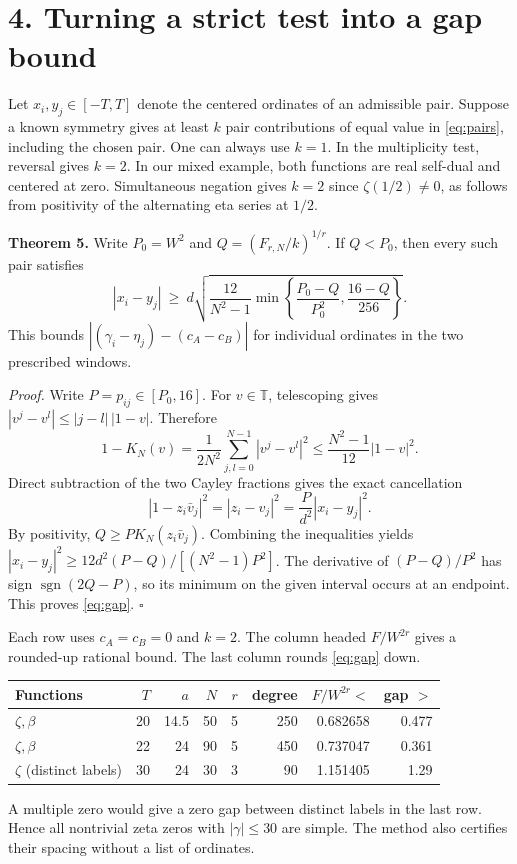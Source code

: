 \documentclass[11pt,letterpaper]{article}
\newcommand{\HH}[1]{\section*{\color{ink}#1}}
\newcommand{\subt}[1]{\par\smallskip{\sffamily\bfseries\color{teal}#1}\par\nobreak}
\newcommand{\op}[1]{\operatorname{#1}}
\newcommand{\TT}{\mathbb T}
\begin{document}
\newpage
\HH{4. Turning a strict test into a gap bound}
Let $x_i,y_j\in[-T,T]$ denote the centered ordinates of an admissible pair.
Suppose a known symmetry gives at least $k$ pair contributions of equal value
in \eqref{eq:pairs}, including the chosen pair. One can always use $k=1$.
In the multiplicity test, reversal gives $k=2$. In our mixed example,
both functions are real self-dual and centered at zero. Simultaneous
negation gives $k=2$ since $\zeta(1/2)\ne0$, as follows from positivity of the alternating eta
series at $1/2$.

\textbf{Theorem 5.} Write $P_0=W^2$ and $Q=(F_{r,N}/k)^{1/r}$.
If $Q<P_0$, then every such pair satisfies
\begin{equation}
 |x_i-y_j|\ \ge\ d\sqrt{\frac{12}{N^2-1}
   \min\!\left\{\frac{P_0-Q}{P_0^2},\frac{16-Q}{256}\right\}}.
 \label{eq:gap}
\end{equation}
This bounds $|(\gamma_i-\eta_j)-(c_A-c_B)|$ for individual ordinates
in the two prescribed windows.

\emph{Proof.} Write $P=p_{ij}\in[P_0,16]$. For $v\in\TT$, telescoping gives
$|v^j-v^l|\le |j-l|\,|1-v|$. Therefore
\[
 1-K_N(v)=\frac1{2N^2}\sum_{j,l=0}^{N-1}|v^j-v^l|^2
       \le\frac{N^2-1}{12}|1-v|^2 .
\]
Direct subtraction of the two Cayley fractions gives the exact cancellation
\[
 |1-z_i\bar v_j|^2=|z_i-v_j|^2=\frac{P}{d^2}|x_i-y_j|^2 .
\]
By positivity, $Q\ge P K_N(z_i\bar v_j)$. Combining the inequalities yields
$|x_i-y_j|^2\ge 12d^2(P-Q)/[(N^2-1)P^2]$. The derivative of
$(P-Q)/P^2$ has sign $\op{sgn}(2Q-P)$, so its minimum on the given
interval occurs at an endpoint. This proves \eqref{eq:gap}. \hfill$\square$

\subt{Verified applications}
Each row uses $c_A=c_B=0$ and $k=2$. The column headed $F/W^{2r}$
gives a rounded-up rational bound. The last column rounds \eqref{eq:gap} down.
\begin{center}\small
\begin{tabular}{@{}lrrrrrrr@{}}\toprule
Functions & $T$ & $a$ & $N$ & $r$ & degree & $F/W^{2r}<$ & gap $>$\\\midrule
$\zeta,\beta$ &20&14.5&50&5&250&0.682658&0.477\\
$\zeta,\beta$ &22&24&90&5&450&0.737047&0.361\\
$\zeta$ (distinct labels)&30&24&30&3&90&1.151405&1.29\\\bottomrule
\end{tabular}
\end{center}
A multiple zero would give a zero gap between distinct labels in the last row.
Hence all nontrivial zeta zeros with $|\gamma|\le30$ are simple. The method
also certifies their spacing without a list of ordinates.
\end{document}
